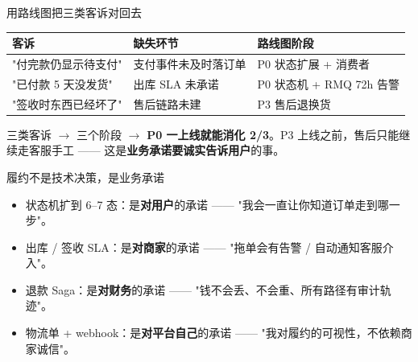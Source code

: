 \begin{frame}{用路线图把三类客诉对回去}
\begin{tabular}{@{}lll@{}}
\toprule
客诉 & 缺失环节 & 路线图阶段 \\
\midrule
"付完款仍显示待支付"   & 支付事件未及时落订单     & P0 状态扩展 + 消费者 \\
"已付款 5 天没发货"   & 出库 SLA 未承诺          & P0 状态机 + RMQ 72h 告警 \\
"签收时东西已经坏了"  & 售后链路未建             & P3 售后退换货 \\
\bottomrule
\end{tabular}
\vspace{2mm}
\small 三类客诉 $\to$ 三个阶段 $\to$ \textbf{P0 一上线就能消化 2/3}。P3 上线之前，售后只能继续走客服手工 —— 这是\textbf{业务承诺要诚实告诉用户}的事。
\end{frame}

\begin{frame}{履约不是技术决策，是业务承诺}
\begin{itemize}
  \item 状态机扩到 6--7 态：是\textbf{对用户}的承诺 —— "我会一直让你知道订单走到哪一步"。
  \item 出库 / 签收 SLA：是\textbf{对商家}的承诺 —— "拖单会有告警 / 自动通知客服介入"。
  \item 退款 Saga：是\textbf{对财务}的承诺 —— "钱不会丢、不会重、所有路径有审计轨迹"。
  \item 物流单 + webhook：是\textbf{对平台自己}的承诺 —— "我对履约的可视性，不依赖商家诚信"。
\end{itemize}
\end{frame}

\appendix

